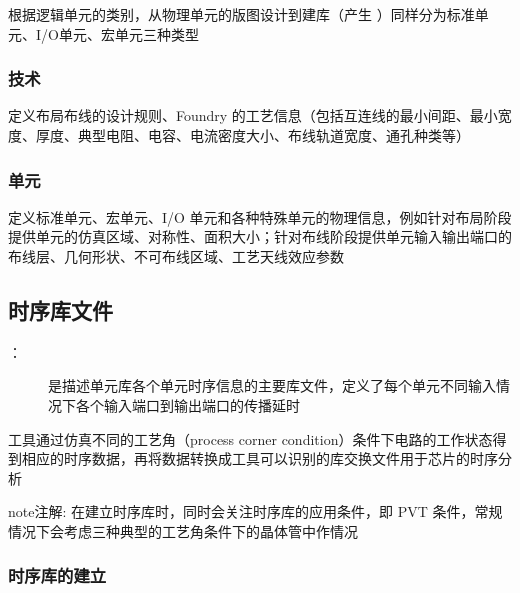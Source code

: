 \documentclass[letterpaper,10pt,english]{sphinxmanual}
\begin{document}
\sphinxAtStartPar
根据逻辑单元的类别，从物理单元的版图设计到建库（产生  ）同样分为标准单元、I/O单元、宏单元三种类型


\subsubsection{技术 }
\label{\detokenize{chapter2/_u7269_u7406_u5e93_u4ea4_u6362_u683c_u5f0f(LEF)_u6587_u4ef6:id2}}
\sphinxAtStartPar
定义布局布线的设计规则、Foundry 的工艺信息（包括互连线的最小间距、最小宽度、厚度、典型电阻、电容、电流密度大小、布线轨道宽度、通孔种类等）


\subsubsection{单元 }
\label{\detokenize{chapter2/_u7269_u7406_u5e93_u4ea4_u6362_u683c_u5f0f(LEF)_u6587_u4ef6:id3}}
\sphinxAtStartPar
定义标准单元、宏单元、I/O 单元和各种特殊单元的物理信息，例如针对布局阶段提供单元的仿真区域、对称性、面积大小；针对布线阶段提供单元输入输出端口的布线层、几何形状、不可布线区域、工艺天线效应参数


\subsection{时序库文件}
\label{\detokenize{chapter2/_u65f6_u5e8f_u5e93_u6587_u4ef6:id1}}\label{\detokenize{chapter2/_u65f6_u5e8f_u5e93_u6587_u4ef6::doc}}\begin{description}
\item[{ ：}] \leavevmode
\sphinxAtStartPar
是描述单元库各个单元时序信息的主要库文件，定义了每个单元不同输入情况下各个输入端口到输出端口的传播延时

\end{description}

\sphinxAtStartPar
工具通过仿真不同的工艺角（process corner condition）条件下电路的工作状态得到相应的时序数据，再将数据转换成工具可以识别的库交换文件用于芯片的时序分析

\begin{sphinxadmonition}{note}{注解:}
\sphinxAtStartPar
在建立时序库时，同时会关注时序库的应用条件，即 PVT 条件，常规情况下会考虑三种典型的工艺角条件下的晶体管中作情况
\end{sphinxadmonition}


\subsubsection{时序库的建立}
\label{\detokenize{chapter2/_u65f6_u5e8f_u5e93_u6587_u4ef6:id2}}
\begin{figure}[htbp]
\centering

\noindent{}
\end{figure}
\end{document}
